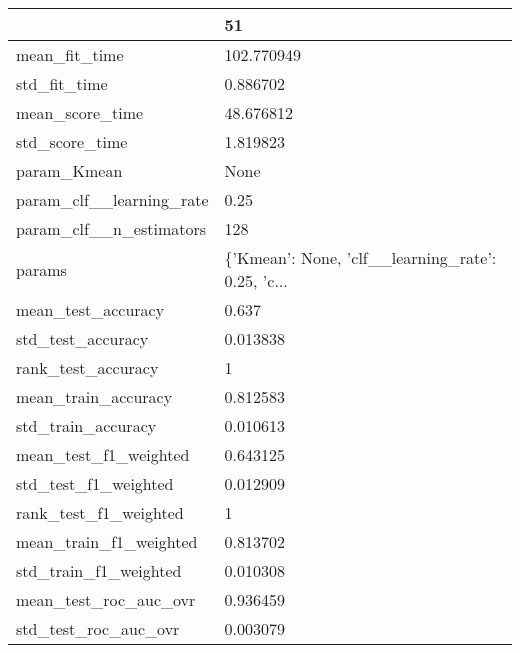 \begin{tabular}{ll}
\toprule
{} &                                                 51 \\
\midrule
mean\_fit\_time               &                                         102.770949 \\
std\_fit\_time                &                                           0.886702 \\
mean\_score\_time             &                                          48.676812 \\
std\_score\_time              &                                           1.819823 \\
param\_Kmean                 &                                               None \\
param\_clf\_\_learning\_rate    &                                               0.25 \\
param\_clf\_\_n\_estimators     &                                                128 \\
params                      &  \{'Kmean': None, 'clf\_\_learning\_rate': 0.25, 'c... \\
mean\_test\_accuracy          &                                              0.637 \\
std\_test\_accuracy           &                                           0.013838 \\
rank\_test\_accuracy          &                                                  1 \\
mean\_train\_accuracy         &                                           0.812583 \\
std\_train\_accuracy          &                                           0.010613 \\
mean\_test\_f1\_weighted       &                                           0.643125 \\
std\_test\_f1\_weighted        &                                           0.012909 \\
rank\_test\_f1\_weighted       &                                                  1 \\
mean\_train\_f1\_weighted      &                                           0.813702 \\
std\_train\_f1\_weighted       &                                           0.010308 \\
mean\_test\_roc\_auc\_ovr       &                                           0.936459 \\
std\_test\_roc\_auc\_ovr        &                                           0.003079 \\

\end{tabular}
